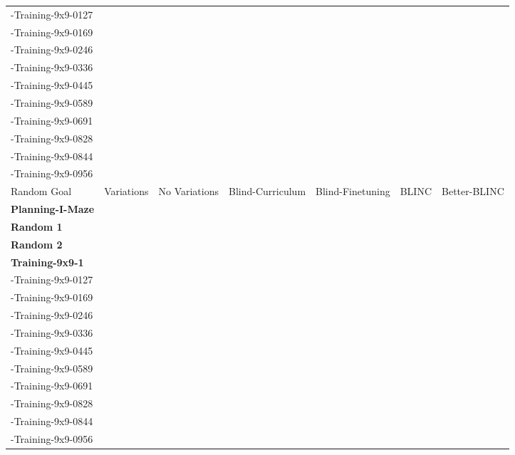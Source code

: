 \begin{table}[h]
\begin{center}
{\begin{tabular}{lcccccc}
            -Training-9x9-0127           &  &   &  &  &  & \\
            -Training-9x9-0169           &  &   &  &  &  & \\
            -Training-9x9-0246           &  &   &  &  &  & \\
            -Training-9x9-0336           &  &   &  &  &  & \\
            -Training-9x9-0445           &  &   &  &  &  & \\
            -Training-9x9-0589           &  &   &  &  &  & \\
            -Training-9x9-0691           &  &   &  &  &  & \\
            -Training-9x9-0828           &  &   &  &  &  & \\
            -Training-9x9-0844           &  &   &  &  &  & \\
            -Training-9x9-0956           &  &   &  &  &  & \\
          \midrule
            Random Goal & Variations & No Variations & Blind-Curriculum & Blind-Finetuning & BLINC & Better-BLINC\\
          \midrule
            \textbf{Planning-I-Maze}    &  &   &  &  &  & \\
            \textbf{Random 1}           &  &   &  &  &  & \\
            \textbf{Random 2}           &  &   &  &  &  & \\
            \textbf{Training-9x9-1}     &  &   &  &  &  & \\
            -Training-9x9-0127           &  &   &  &  &  & \\
            -Training-9x9-0169           &  &   &  &  &  & \\
            -Training-9x9-0246           &  &   &  &  &  & \\
            -Training-9x9-0336           &  &   &  &  &  & \\
            -Training-9x9-0445           &  &   &  &  &  & \\
            -Training-9x9-0589           &  &   &  &  &  & \\
            -Training-9x9-0691           &  &   &  &  &  & \\
            -Training-9x9-0828           &  &   &  &  &  & \\
            -Training-9x9-0844           &  &   &  &  &  & \\
            -Training-9x9-0956           &  &   &  &  &  & \\

\end{tabular}}
\end{center}
\end{table}

